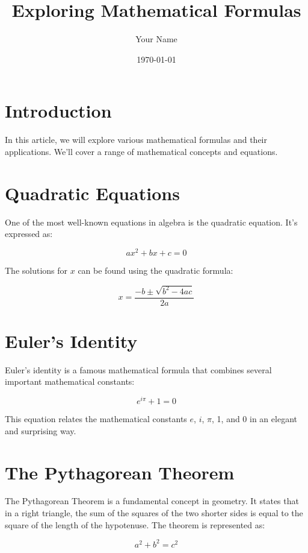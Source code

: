 \documentclass{article}
\title{Exploring Mathematical Formulas}
\author{Your Name}
\date{\today}
\begin{document}
\maketitle

\section{Introduction}
In this article, we will explore various mathematical formulas and their applications. We'll cover a range of mathematical concepts and equations.

\section{Quadratic Equations}
One of the most well-known equations in algebra is the quadratic equation. It's expressed as:

\begin{equation}
    ax^2 + bx + c = 0
\end{equation}

The solutions for $x$ can be found using the quadratic formula:

\begin{equation}
    x = \frac{-b \pm \sqrt{b^2 - 4ac}}{2a}
\end{equation}

\section{Euler's Identity}
Euler's identity is a famous mathematical formula that combines several important mathematical constants:

\begin{equation}
    e^{i\pi} + 1 = 0
\end{equation}

This equation relates the mathematical constants $e$, $i$, $\pi$, 1, and 0 in an elegant and surprising way.

\section{The Pythagorean Theorem}
The Pythagorean Theorem is a fundamental concept in geometry. It states that in a right triangle, the sum of the squares of the two shorter sides is equal to the square of the length of the hypotenuse. The theorem is represented as:

\begin{equation}
    a^2 + b^2 = c^2
\end{equation}
\end{document}

